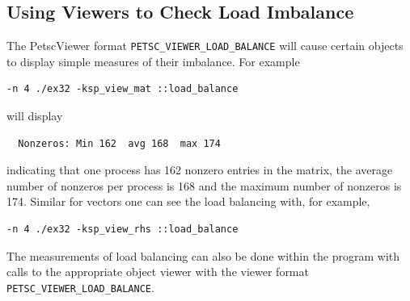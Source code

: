 {{{\subsection{Using Viewers to Check Load Imbalance}

The PetscViewer format \lstinline{PETSC_VIEWER_LOAD_BALANCE} will cause certain objects to display simple measures of their imbalance. For example
\begin{lstlisting}
-n 4 ./ex32 -ksp_view_mat ::load_balance
\end{lstlisting}
will display
\begin{lstlisting}
  Nonzeros: Min 162  avg 168  max 174
\end{lstlisting}
indicating that one process has 162 nonzero entries in the matrix, the average number of nonzeros per process is 168 and the maximum number of nonzeros is 174.
Similar for vectors one can see the load balancing with, for example, 
\begin{lstlisting}
-n 4 ./ex32 -ksp_view_rhs ::load_balance
\end{lstlisting}
The measurements of load balancing can also be done within the program with calls to the appropriate object viewer with the viewer format \lstinline{PETSC_VIEWER_LOAD_BALANCE}.



}}}
